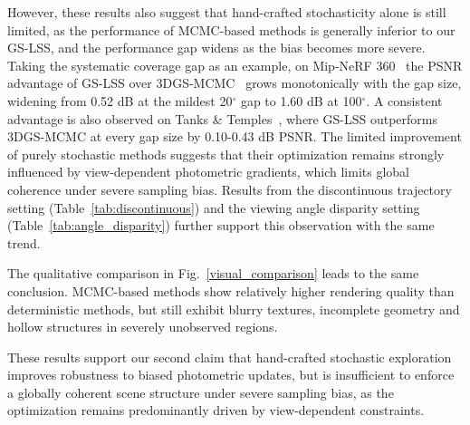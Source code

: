 \documentclass[lettersize,journal]{IEEEtran}
\begin{document}
However, these results also suggest that hand-crafted stochasticity alone is still limited, as the performance of MCMC-based methods is generally inferior to our GS-LSS, and the performance gap widens as the bias becomes more severe.
Taking the systematic coverage gap as an example, on Mip-NeRF 360~\cite{mipnerf360} the PSNR advantage of GS-LSS over 3DGS-MCMC~\cite{mcmc} grows monotonically with the gap size, widening from 0.52 dB at the mildest 20$^\circ$ gap to 1.60 dB at 100$^\circ$. A consistent advantage is also observed on Tanks \& Temples~\cite{tankstemples}, where GS-LSS outperforms 3DGS-MCMC at every gap size by 0.10-0.43 dB PSNR.
The limited improvement of purely stochastic methods suggests that their optimization remains strongly influenced by view-dependent photometric gradients, which limits global coherence under severe sampling bias.
Results from the discontinuous trajectory setting (Table~\ref{tab:discontinuous}) and the viewing angle disparity setting (Table~\ref{tab:angle_disparity}) 
further support this observation with the same trend.

The qualitative comparison in Fig.~\ref{visual_comparison} leads to the same conclusion. 
MCMC-based methods show relatively higher rendering quality than deterministic methods, 
but still exhibit blurry textures, incomplete geometry and hollow structures in severely unobserved regions. 

These results support our second claim that hand-crafted stochastic exploration improves robustness to biased photometric updates, but is insufficient to enforce a globally coherent scene structure under severe sampling bias, as the optimization remains predominantly driven by view-dependent constraints.
\end{document}
